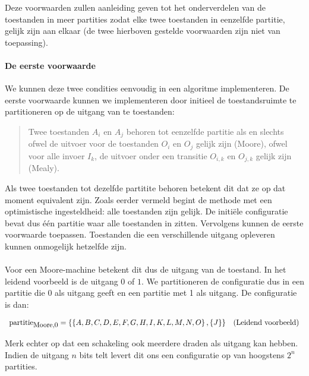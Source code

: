 Deze voorwaarden zullen aanleiding geven tot het onderverdelen van de toestanden in meer partities zodat elke twee toestanden in eenzelfde partitie, gelijk zijn aan elkaar (de twee hierboven gestelde voorwaarden zijn niet van toepassing).

\paragraph{De eerste voorwaarde}
We kunnen deze twee condities eenvoudig in een algoritme implementeren. De eerste voorwaarde kunnen we implementeren door initieel de toestandsruimte te partitioneren op de uitgang van te toestanden:

\begin{quote}
Twee toestanden $A_i$ en $A_j$ behoren tot eenzelfde partitie als en slechts ofwel de uitvoer voor de toestanden $O_i$ en $O_j$ gelijk zijn (Moore), ofwel voor alle invoer $I_k$, de uitvoer onder een transitie $O_{i,k}$ en $O_{j,k}$ gelijk zijn (Mealy).
\end{quote}

Als twee toestanden tot dezelfde partitite behoren betekent dit dat ze op dat moment equivalent zijn. Zoals eerder vermeld begint de methode met een optimistische ingesteldheid: alle toestanden zijn gelijk. De initi\"ele configuratie bevat dus \'e\'en partitie waar alle toestanden in zitten. Vervolgens kunnen de eerste voorwaarde toepassen. Toestanden die een verschillende uitgang opleveren kunnen onmogelijk hetzelfde zijn.

\paragraph{}
Voor een Moore-machine betekent dit dus de uitgang van de toestand. In het leidend voorbeeld is de uitgang $0$ of $1$. We partitioneren de configuratie dus in een partitie die $0$ als uitgang geeft en een partitie met 1 als uitgang. De configuratie is dan:

\begin{equation}
\begin{array}{lr}
\mbox{partitie}_{\mbox{\small{Moore,0}}}=\left\{ \left\{ A,B,C,D,E,F,G,H,I,K,L,M,N,O \right\},\left\{ J \right\} \right\}&\mbox{(Leidend voorbeeld)}
\end{array}
\end{equation}

Merk echter op dat een schakeling ook meerdere draden als uitgang kan hebben. Indien de uitgang $n$ bits telt levert dit ons een configuratie op van hoogstens $2^n$ partities.

